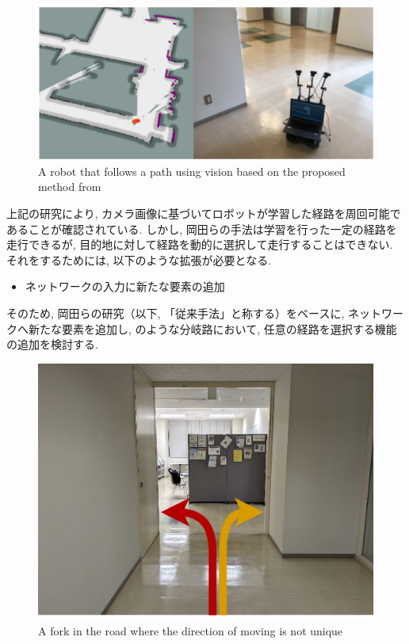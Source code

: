 \begin{figure}[hbtp]
     \centering
    \includegraphics[keepaspectratio, scale=0.5]
         {images/okada_nav.png}
    \caption{A robot that follows a path using vision based on the proposed method from \cite{okada1}}
    \label{Fig:okada_nav}
\end{figure}

\newpage

上記の研究により, カメラ画像に基づいてロボットが学習した経路を周回可能であることが確認されている. しかし, 岡田らの手法は学習を行った一定の経路を走行できるが, 目的地に対して経路を動的に選択して走行することはできない. それをするためには, 以下のような拡張が必要となる.

\begin{itemize}
     \item ネットワークの入力に新たな要素の追加
\end{itemize}

そのため, 岡田らの研究（以下, 「従来手法」と称する）をベースに, ネットワークへ新たな要素を追加し, のような分岐路において, 任意の経路を選択する機能の追加を検討する.

\vspace{1cm}

\begin{figure}[hbtp]
     \centering
    \includegraphics[keepaspectratio, scale=0.5]
         {images/road.png}
    \caption{A fork in the road where the direction of moving is not unique}
    \label{Fig:road}
\end{figure}

